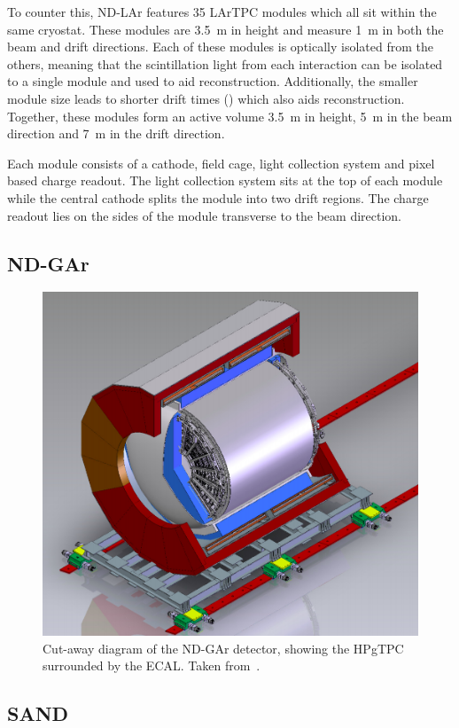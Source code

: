 To counter this, ND-LAr features 35 LArTPC modules which all sit within the same cryostat.
These modules are \SI{3.5}{\metre} in height and measure \SI{1}{\metre} in both the beam and drift directions.
Each of these modules is optically isolated from the others, meaning that the scintillation light from each interaction can be isolated to a single module and used to aid reconstruction.
Additionally, the smaller module size leads to shorter drift times () which also aids reconstruction.
Together, these modules form an active volume \SI{3.5}{\metre} in height, \SI{5}{\metre} in the beam direction and \SI{7}{\metre} in the drift direction.

Each module consists of a cathode, field cage, light collection system and pixel based charge readout.
The light collection system sits at the top of each module while the central cathode splits the module into two drift regions.
The charge readout lies on the sides of the module transverse to the beam direction.

\subsection{ND-GAr}
\label{sec:dune:nd:gar}

\begin{figure}[h]
  \centering
  \includegraphics[width=.7\linewidth]{files/figures/dune_detector/ndGarDiag}
  \caption[Cut-away of the ND-GAr detector.]{Cut-away diagram of the ND-GAr detector, showing the HPgTPC surrounded by the ECAL. Taken from~\cite{ndCdr}.}
  \label{fig:ndGarDiag}
\end{figure}

\subsection{SAND}
\label{sec:dune:nd:sand}

